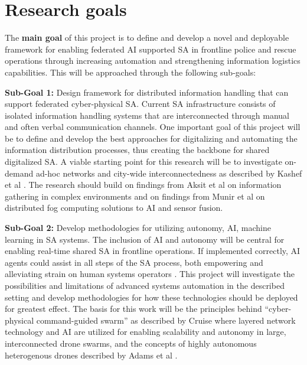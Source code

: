 \section {Research goals}
The \textbf{main goal} of this project is to define and develop a novel and deployable framework for enabling federated AI supported SA in frontline police and rescue operations through increasing automation and strengthening information logistics capabilities. This will be approached through the following sub-goals: 

\textbf{Sub-Goal 1:} Design framework for distributed information handling that can support federated cyber-physical SA. Current SA infrastructure consists of isolated information handling systems that are interconnected through manual and often verbal communication channels. One important goal of this project will be to define and develop the best approaches for digitalizing and automating the information distribution processes, thus creating the backbone for shared digitalized SA. A viable starting point for this research will be to investigate on-demand ad-hoc networks and city-wide interconnectedness as described by Kashef et al \cite{kashef_smart_2021}. The research should build on findings from Aksit et al \cite{aksit_data_2023} on information gathering in complex environments and on findings from Munir et al \cite{munir_artificial_2021} on distributed fog computing solutions to AI and sensor fusion. 

\textbf{Sub-Goal 2:} Develop methodologies for utilizing autonomy, AI, machine learning in SA systems. The inclusion of AI and autonomy will be central for enabling real-time shared SA in frontline operations. If implemented correctly, AI agents could assist in all steps of the SA process, both empowering and alleviating strain on human systems operators \cite{cruise_cyber-physical_2018}. This project will investigate the possibilities and limitations of advanced systems automation in the described setting and develop methodologies for how these technologies should be deployed for greatest effect. The basis for this work will be the principles behind “cyber-physical command-guided swarm” as described by Cruise \cite{cruise_cyber-physical_2018} where layered network technology and AI are utilized for enabling scalability and autonomy in large, interconnected drone swarms, and the concepts of highly autonomous heterogenous drones described by Adams et al \cite{adams_can_2023}. 

